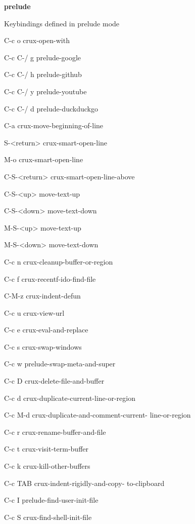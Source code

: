 \documentclass[10pt]{article}
\renewcommand\subsection[1]{\smallskip\par\textbf{\color{heading}#1}}
\newcommand\humanreadable[1]{{\par\color{default}\small\sffamily#1}}
\begin{document}
\begin{multicols}{4}
  \subsection{prelude}

  \humanreadable{Keybindings defined in prelude mode}
  \begin{keylist}
  \item[C-c o] crux-open-with
  \item[C-c C-/ g] prelude-google
  \item[C-c C-/ h] prelude-github
  \item[C-c C-/ y] prelude-youtube
  \item[C-c C-/ d] prelude-duckduckgo
  \item[C-a] crux-move-beginning-of-line
  \item[S-<return>] crux-smart-open-line
  \item[M-o] crux-smart-open-line
  \item[C-S-<return>] crux-smart-open-line-above
  \item[C-S-<up>] move-text-up
  \item[C-S-<down>] move-text-down
  \item[M-S-<up>] move-text-up
  \item[M-S-<down>] move-text-down
  \item[C-c n] crux-cleanup-buffer-or-region
  \item[C-c f] crux-recentf-ido-find-file
  \item[C-M-z] crux-indent-defun
  \item[C-c u] crux-view-url
  \item[C-c e] crux-eval-and-replace
  \item[C-c s] crux-swap-windows
  \item[C-c w] prelude-swap-meta-and-super
  \item[C-c D] crux-delete-file-and-buffer
  \item[C-c d] crux-duplicate-current-line-or-region
  \item[C-c M-d] crux-duplicate-and-comment-current-
    line-or-region
  \item[C-c r] crux-rename-buffer-and-file
  \item[C-c t] crux-visit-term-buffer
  \item[C-c k] crux-kill-other-buffers
  \item[C-c TAB] crux-indent-rigidly-and-copy-
    to-clipboard
  \item[C-c I] prelude-find-user-init-file
  \item[C-c S] crux-find-shell-init-file

\end{keylist}
\end{multicols}
\end{document}
